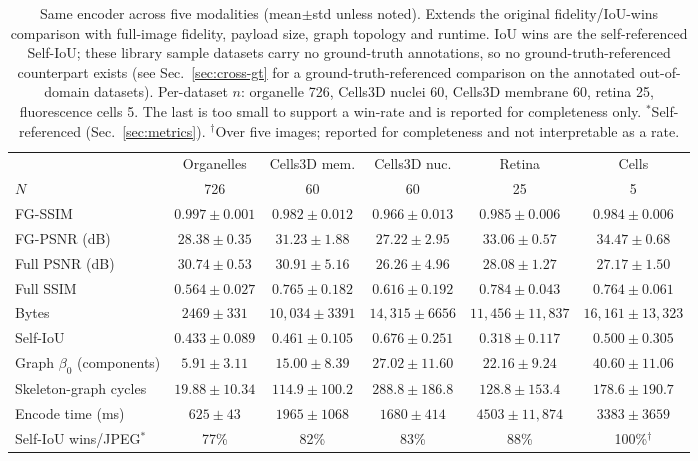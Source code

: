 \documentclass[10pt,a4paper]{article}
\begin{document}
\begin{table}[t]
\centering
\caption{Same encoder across five modalities (mean$\pm$std unless noted).
Extends the original fidelity/IoU-wins
comparison with full-image fidelity, payload size, graph topology and
runtime. IoU wins are the self-referenced Self-IoU; these library sample
datasets carry no ground-truth annotations, so no ground-truth-referenced
counterpart exists (see Sec.~\ref{sec:cross-gt} for a ground-truth-referenced
comparison on the annotated out-of-domain datasets). Per-dataset $n$: organelle 726, Cells3D nuclei 60, Cells3D
membrane 60, retina 25, fluorescence cells 5. The last is too small to
support a win-rate and is reported for completeness only. $^{*}$Self-referenced (Sec.~\ref{sec:metrics}). $^{\dagger}$Over five images; reported for completeness and not interpretable as a rate.}
\label{tab:cross}
\footnotesize
\setlength{\tabcolsep}{2pt}
\begin{tabular}{lccccc}
\toprule
 & Organelles & Cells3D mem. & Cells3D nuc. & Retina & Cells \\
$N$ & 726 & 60 & 60 & 25 & 5\\
\midrule
FG-SSIM        & $0.997\pm0.001$ & $0.982\pm0.012$ & $0.966\pm0.013$ & $0.985\pm0.006$ & $0.984\pm0.006$\\
FG-PSNR (dB)   & $28.38\pm0.35$ & $31.23\pm1.88$ & $27.22\pm2.95$ & $33.06\pm0.57$ & $34.47\pm0.68$\\
Full PSNR (dB) & $30.74\pm0.53$ & $30.91\pm5.16$ & $26.26\pm4.96$ & $28.08\pm1.27$ & $27.17\pm1.50$\\
Full SSIM      & $0.564\pm0.027$ & $0.765\pm0.182$ & $0.616\pm0.192$ & $0.784\pm0.043$ & $0.764\pm0.061$\\
Bytes          & $2469\pm331$  & $10{,}034\pm3391$ & $14{,}315\pm6656$ & $11{,}456\pm11{,}837$ & $16{,}161\pm13{,}323$\\
Self-IoU       & $0.433\pm0.089$ & $0.461\pm0.105$ & $0.676\pm0.251$ & $0.318\pm0.117$ & $0.500\pm0.305$\\
Graph $\beta_0$ (components) & $5.91\pm3.11$ & $15.00\pm8.39$ & $27.02\pm11.60$ & $22.16\pm9.24$ & $40.60\pm11.06$\\
Skeleton-graph cycles         & $19.88\pm10.34$ & $114.9\pm100.2$ & $288.8\pm186.8$ & $128.8\pm153.4$ & $178.6\pm190.7$\\
Encode time (ms) & $625\pm43$ & $1965\pm1068$ & $1680\pm414$ & $4503\pm11{,}874$ & $3383\pm3659$\\
\midrule
Self-IoU wins/JPEG$^{*}$  & 77\%  & 82\%  & 83\%  & 88\%  & 100\%$^{\dagger}$\\
\bottomrule
\end{tabular}
\end{table}
\end{document}
